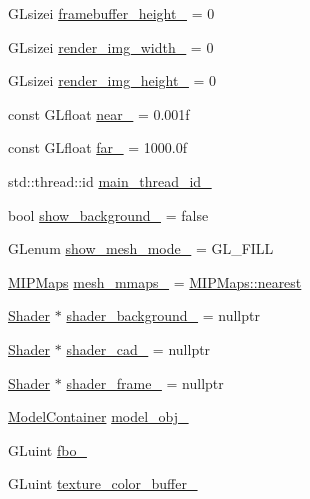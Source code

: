 \begin{DoxyCompactItemize}
G\+Lsizei \mbox{\hyperlink{classSICAD_a3361bb03e52bc0554bb1e3670ef3a0f9}{framebuffer\+\_\+height\+\_\+}} = 0
\item 
G\+Lsizei \mbox{\hyperlink{classSICAD_acbd2113a0cc446db6f59fdedd890aad9}{render\+\_\+img\+\_\+width\+\_\+}} = 0
\item 
G\+Lsizei \mbox{\hyperlink{classSICAD_a29691bc258b500253364c9688f7af655}{render\+\_\+img\+\_\+height\+\_\+}} = 0
\item 
const G\+Lfloat \mbox{\hyperlink{classSICAD_a690437655965101bad97d32e98015dd5}{near\+\_\+}} = 0.\+001f
\item 
const G\+Lfloat \mbox{\hyperlink{classSICAD_a4c4d2e249ac824528e1fe9f97fa207d9}{far\+\_\+}} = 1000.\+0f
\item 
std\+::thread\+::id \mbox{\hyperlink{classSICAD_a6a4623d27b2ee48ad0db90bd075c708c}{main\+\_\+thread\+\_\+id\+\_\+}}
\item 
bool \mbox{\hyperlink{classSICAD_a8db9e37d71a14883be4879e9ea4b6a02}{show\+\_\+background\+\_\+}} = false
\item 
G\+Lenum \mbox{\hyperlink{classSICAD_a9c4c3ba5d071f763ee1956fa31faa3f8}{show\+\_\+mesh\+\_\+mode\+\_\+}} = G\+L\+\_\+\+F\+I\+LL
\item 
\mbox{\hyperlink{classSICAD_a7e092dede6f660355462d6d548214198}{M\+I\+P\+Maps}} \mbox{\hyperlink{classSICAD_a34b0de96321855145937cc5858c019b0}{mesh\+\_\+mmaps\+\_\+}} = \mbox{\hyperlink{classSICAD_a7e092dede6f660355462d6d548214198ad879c351426770bc0b13c3628db1e636}{M\+I\+P\+Maps\+::nearest}}
\item 
\mbox{\hyperlink{classShader}{Shader}} $\ast$ \mbox{\hyperlink{classSICAD_a46edf33acc9f7ea3bd98c7ee6388ce9c}{shader\+\_\+background\+\_\+}} = nullptr
\item 
\mbox{\hyperlink{classShader}{Shader}} $\ast$ \mbox{\hyperlink{classSICAD_a6c11f0e8dc8cbdd91748c230fc680833}{shader\+\_\+cad\+\_\+}} = nullptr
\item 
\mbox{\hyperlink{classShader}{Shader}} $\ast$ \mbox{\hyperlink{classSICAD_ac921e60623f3797253bcbcdd445b903b}{shader\+\_\+frame\+\_\+}} = nullptr
\item 
\mbox{\hyperlink{classSICAD_aca3c9693d298f2e8dc171194c6a7507c}{Model\+Container}} \mbox{\hyperlink{classSICAD_a05fea2b5b027a3b7f37ef9ea4ecd64f0}{model\+\_\+obj\+\_\+}}
\item 
G\+Luint \mbox{\hyperlink{classSICAD_a2c173ad18d42e090b46a539f92f3fe9d}{fbo\+\_\+}}
\item 
G\+Luint \mbox{\hyperlink{classSICAD_a50f1ec3b2545ca40d58466735da80fc6}{texture\+\_\+color\+\_\+buffer\+\_\+}}

\end{DoxyCompactItemize}
